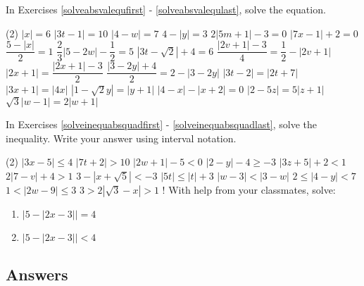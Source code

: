 \label{ExercisesforAppAbsValEqIneq}

In Exercises \ref{solveabsvalequfirst} - \ref{solveabsvalequlast}, solve the equation.

\begin{tasks}(2)
\task  $|x| = 6$ \label{solveabsvalequfirst} 
\task $|3t-1| = 10$
\task $|4-w| = 7$
\task  $4 - |y| = 3$
\task $2|5m+1| - 3 = 0$
\task $|7x-1| + 2 = 0$
\task $\dfrac{5 - |x|}{2} = 1$ 
\task $\dfrac{2}{3} |5-2w| - \dfrac{1}{2} = 5$ 
\task $|3t - \sqrt{2}| + 4 = 6$ 
\task $\dfrac{|2v+1| - 3}{4} = \dfrac{1}{2} - |2v+1|$
\task $|2x+1| = \dfrac{|2x+1| - 3}{2}$
\task $\dfrac{|3-2y|+ 4}{2} = 2 - |3-2y|$
\task $|3t - 2| = |2t + 7|$  
\task $|3x+1| = |4x|$
\task $|1-\sqrt{2} y| = |y+1|$
\task  $|4-x| - |x+2| = 0$
\task $|2-5z| = 5 |z+1|$
\task $\sqrt{3}|w-1| = 2|w+1|$ \label{solveabsvalequlast}
\end{tasks}


In Exercises \ref{solveinequabsquadfirst} - \ref{solveinequabsquadlast}, solve the inequality.  Write your answer using interval notation. 

\begin{tasks}[resume](2)
\task $|3x - 5| \leq 4$ \label{solveinequabsquadfirst}
\task $|7t + 2| > 10$
\task $|2w+1| - 5 < 0$   
\task $|2-y| - 4 \geq -3$
\task $|3z+5| + 2 < 1$   
\task $2|7-v| +4 > 1$
\task $3 - |x+\sqrt{5}| < -3$
\task $|5t| \leq |t|+3$   
\task $|w-3| < |3-w|$
\task  $2 \leq |4-y| < 7$ 
\task $1 < |2w - 9| \leq 3$ 
\task  $3 > 2|\sqrt{3} - x| > 1$ \label{solveinequabsquadlast}
\task!  With help from your classmates, solve:

\begin{enumerate}[label=(\alph*)]
\item  $|5 - |2x-3|| = 4$
\item   $|5 - |2x-3|| < 4$
\end{enumerate}

\end{tasks}

\clearpage

\subsection{Answers}

